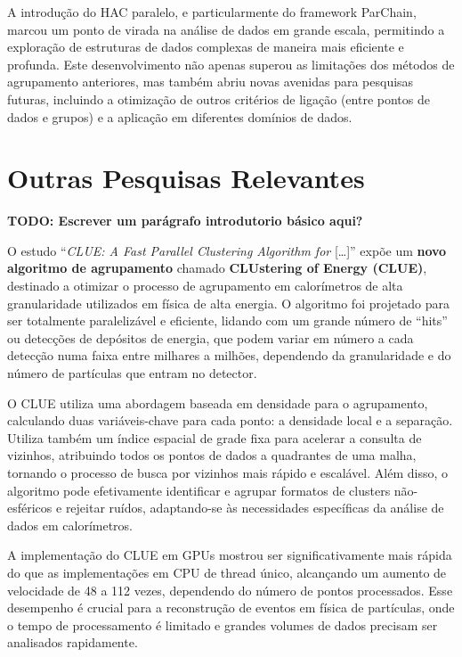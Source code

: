 \documentclass[12pt,
openright, 
oneside, %
a4paper,    %
brazil]{facom-ufu-abntex2}
\begin{document}
A introdução do HAC paralelo, e particularmente do framework ParChain, marcou um ponto de virada na análise de dados em grande escala, permitindo a exploração de estruturas de dados complexas de maneira mais eficiente e profunda. Este desenvolvimento não apenas superou as limitações dos métodos de agrupamento anteriores, mas também abriu novas avenidas para pesquisas futuras, incluindo a otimização de outros critérios de ligação (entre pontos de dados e grupos) e a aplicação em diferentes domínios de dados.




\section{Outras Pesquisas Relevantes}

\textbf{TODO: Escrever um parágrafo introdutorio básico aqui?}


O estudo \enquote{\textit{CLUE: A Fast Parallel Clustering Algorithm for} [\dots]} \cite{clueParallelAlgo2020} expõe um \textbf{novo algoritmo de agrupamento} chamado \textbf{CLUstering of Energy (CLUE)}, destinado a otimizar o processo de agrupamento em calorímetros de alta granularidade utilizados em física de alta energia. O algoritmo foi projetado para ser totalmente paralelizável e eficiente, lidando com um grande número de \enquote{hits} ou detecções de depósitos de energia, que podem variar em número a cada detecção numa faixa entre milhares a milhões, dependendo da granularidade e do número de partículas que entram no detector.

O CLUE utiliza uma abordagem baseada em densidade para o agrupamento, calculando duas variáveis-chave para cada ponto: a densidade local e a separação. Utiliza também um índice espacial de grade fixa para acelerar a consulta de vizinhos, atribuindo todos os pontos de dados a quadrantes de uma malha, tornando o processo de busca por vizinhos mais rápido e escalável. Além disso, o algoritmo pode efetivamente identificar e agrupar formatos de clusters não-esféricos e rejeitar ruídos, adaptando-se às necessidades específicas da análise de dados em calorímetros.

A implementação do CLUE em GPUs mostrou ser significativamente mais rápida do que as implementações em CPU de thread único, alcançando um aumento de velocidade de 48 a 112 vezes, dependendo do número de pontos processados. Esse desempenho é crucial para a reconstrução de eventos em física de partículas, onde o tempo de processamento é limitado e grandes volumes de dados precisam ser analisados rapidamente.
\end{document}
